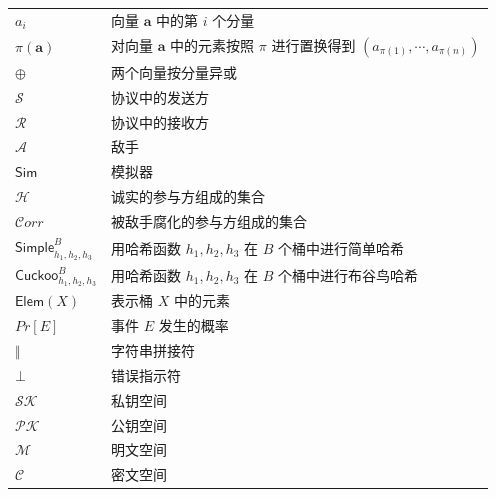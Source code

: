 \documentclass{settings/sdu-thesis}
\newcommand{\Adv}{\mathcal{A}}
\newcommand{\Corr}{\mathcal{C}orr}
\newcommand{\Cuckoo}{\mathsf{Cuckoo}}
\newcommand{\Elem}{\mathsf{Elem}}
\newcommand{\Honest}{\mathcal{H}}
\newcommand{\Rcv}{\mathcal{R}}
\newcommand{\Sd}{\mathcal{S}}
\newcommand{\Simple}{\mathsf{Simple}}
\begin{document}
\begin{longtable}{@{} >{\centering\arraybackslash}p{2.5cm} p{12cm} @{}}
        $a_i$ & 向量 $\textbf{a}$ 中的第 $i$ 个分量 \\ 
        $\pi(\textbf{a})$ & 对向量 $\textbf{a}$ 中的元素按照 $\pi$ 进行置换得到 $(a_{\pi(1)}, \cdots, a_{\pi(n)})$ \\
        $\oplus$ & 两个向量按分量异或 \\
        $\Sd$ & 协议中的发送方 \\
        $\Rcv$ & 协议中的接收方 \\
        $\Adv$ & 敌手 \\
        $\mathsf{Sim}$ & 模拟器 \\
        $\Honest$ & 诚实的参与方组成的集合 \\
        $\Corr$ & 被敌手腐化的参与方组成的集合 \\
        $\Simple_{h_1,h_2,h_3}^B$ & 用哈希函数 $h_1, h_2, h_3$ 在 $B$ 个桶中进行简单哈希 \\
        $\Cuckoo_{h_1,h_2,h_3}^B$ & 用哈希函数 $h_1, h_2, h_3$ 在 $B$ 个桶中进行布谷鸟哈希 \\
        $\Elem(X)$ & 表示桶 $X$ 中的元素 \\
        $Pr[E]$ & 事件 $E$ 发生的概率 \\
        $\Vert$ & 字符串拼接符 \\
        $\bot$ & 错误指示符 \\
        $\mathcal{SK}$ & 私钥空间 \\
        $\mathcal{PK}$ & 公钥空间 \\
        $\mathcal{M}$ & 明文空间 \\
        $\mathcal{C}$ & 密文空间 \\
\end{longtable}

\ftcontent













\end{document}

